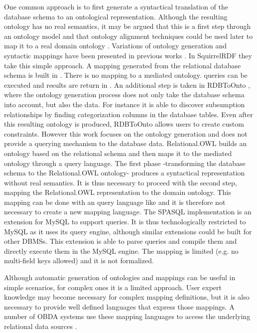 One common approach is to first generate a syntactical translation of the database schema to an ontological representation. Although the resulting ontology has no real semantics, it may be argued that this is a first step through an ontology model and that ontology alignment techniques could be used later to map it to a real domain ontology \cite{Lubyte_09}. Variations of ontology generation and syntactic mappings have been presented in previous works \cite{Seaborne_07,Cerbah_08,Laborda_06,Prudhommeaux_07}.
In SquirrelRDF \cite{Squirrell_06} they take this simple approach. A mapping generated from the relational database schema is built in \rdf. There is no mapping to a mediated ontology. \sparql queries can be executed and results are return in \rdf.
An additional step is taken in RDBToOnto \cite{Cerbah_08} , where the ontology generation process does not only take the database schema into account, but also the data. For instance it is able to discover subsumption relationships by finding categorization columns in the database tables. Even after this resulting ontology is produced, RDBToOnto allows users to create custom constraints. However this work focuses on the ontology generation and does not provide a querying mechanism to the database data.
Relational.OWL \cite{Laborda_06} builds an ontology based on the relational schema and then maps it to the mediated ontology through a \rdf query language. The first phase -transforming the database schema to the Relational.OWL ontology- produces a syntactical representation without real semantics. It is thus necessary to proceed with the second step, mapping the Relational.OWL representation to the domain ontology. This mapping can be done with an \rdf query language like \sparql and it is therefore not necessary to create a new mapping language.
The SPASQL implementation \cite{Prudhommeaux_07} is an extension for MySQL to support \sparql queries. It is thus technologically restricted to MySQL as it uses its query engine, although similar extensions could be built for other DBMSs. This extension is able to parse \sparql queries and compile them and directly execute them in the MySQL engine. The mapping is limited (e.g. no multi-field keys allowed) and it is not formalized.

Although automatic generation of ontologies and mappings can be useful in simple scenarios, for complex ones it is a limited approach. User expert knowledge may become necessary for complex mapping definitions, but it is also necessary to provide well defined languages that express those mappings. A number of OBDA systems use these mapping languages to 
access the underlying relational data sources \cite{Sahoo_09}.

